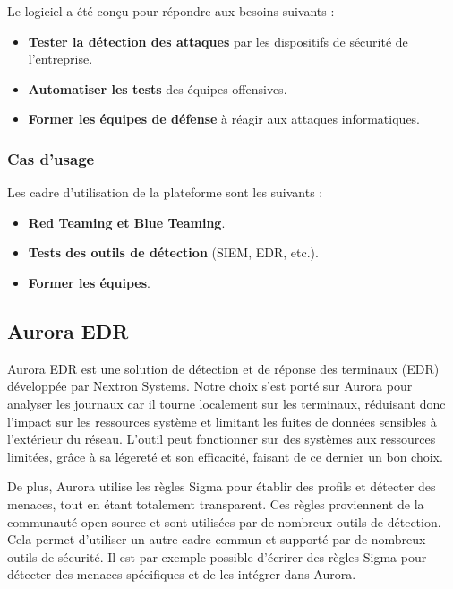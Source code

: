 \documentclass[12pt,letterpaper]{article}
\begin{document}
Le logiciel a été conçu pour répondre aux besoins suivants :
\begin{itemize}
    \item \textbf{Tester la détection des attaques} par les dispositifs de sécurité de l'entreprise.
    \item \textbf{Automatiser les tests} des équipes offensives.
    \item \textbf{Former les équipes de défense} à réagir aux attaques informatiques.
\end{itemize}

\subsubsection{Cas d'usage}

Les cadre d'utilisation de la plateforme sont les suivants :
\begin{itemize}
    \item \textbf{Red Teaming et Blue Teaming}.
    \item \textbf{Tests des outils de détection} (SIEM, EDR, etc.).
    \item \textbf{Former les équipes}.
\end{itemize}

\subsection{Aurora EDR}

Aurora EDR est une solution de détection et de réponse des terminaux (EDR) développée par Nextron Systems.
Notre choix s'est porté sur Aurora pour analyser les journaux car il tourne localement sur les terminaux, réduisant donc l'impact sur les ressources système et limitant les fuites de données sensibles à l'extérieur du réseau.
L'outil peut fonctionner sur des systèmes aux ressources limitées, grâce à sa légereté et son efficacité, faisant de ce dernier un bon choix.

\bigskip

De plus, Aurora utilise les règles Sigma pour établir des profils et détecter des menaces, tout en étant totalement transparent.
Ces règles proviennent de la communauté open-source et sont utilisées par de nombreux outils de détection.
Cela permet d'utiliser un autre cadre commun et supporté par de nombreux outils de sécurité.
Il est par exemple possible d'écrirer des règles Sigma pour détecter des menaces spécifiques et de les intégrer dans Aurora.
\end{document}
